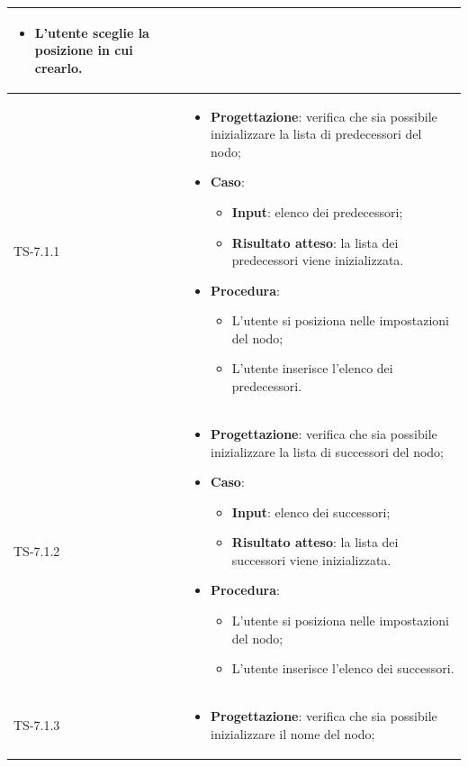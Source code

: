 \begin{longtable}{|C{2.5cm}|C{13cm}|}
\begin{itemize}
\begin{itemize}
		\item L'utente sceglie la posizione in cui crearlo.
	\end{itemize} 
\end{itemize} \\
\hline
	{TS-7.1.1} &
\begin{itemize}
	\item \textbf{Progettazione}: verifica che sia possibile inizializzare la lista di predecessori del nodo;
	\item \textbf{Caso}: 
	\begin{itemize}
		\item \textbf{Input}: elenco dei predecessori;
		\item \textbf{Risultato atteso}: la lista dei predecessori viene inizializzata.
	\end{itemize}
	\item \textbf{Procedura}:
	\begin{itemize}
		\item L'utente si posiziona nelle impostazioni del nodo;
		\item L'utente inserisce l'elenco dei predecessori.
	\end{itemize} 
\end{itemize}
	  \\
	\hline
	{TS-7.1.2} & 
\begin{itemize}
	\item \textbf{Progettazione}: verifica che sia possibile inizializzare la lista di successori del nodo;
	\item \textbf{Caso}: 
	\begin{itemize}
		\item \textbf{Input}: elenco dei successori;
		\item \textbf{Risultato atteso}: la lista dei successori viene inizializzata.
	\end{itemize}
	\item \textbf{Procedura}:
	\begin{itemize}
		\item L'utente si posiziona nelle impostazioni del nodo;
		\item L'utente inserisce l'elenco dei successori.
	\end{itemize} 
\end{itemize}
	  \\
	\hline
	{TS-7.1.3} &
\begin{itemize}
	\item \textbf{Progettazione}: verifica che sia possibile inizializzare il nome del nodo;

\end{itemize}
\end{longtable}
